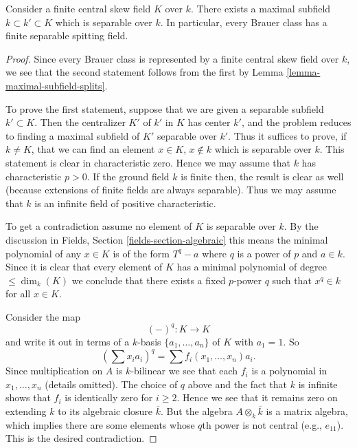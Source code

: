 \begin{proposition}
\label{proposition-separable-splitting-field}
Consider a finite central skew field $K$ over $k$.
There exists a maximal subfield $k \subset k' \subset K$ which
is separable over $k$.
In particular, every Brauer class has a finite separable
spitting field.
\end{proposition}

\begin{proof}
Since every Brauer class is represented by a finite central skew
field over $k$, we see that the second statement follows from the
first by
Lemma \ref{lemma-maximal-subfield-splits}.

\medskip\noindent
To prove the first statement, suppose that we are given a separable
subfield $k' \subset K$. Then the centralizer $K'$ of $k'$ in $K$
has center $k'$, and the problem reduces to finding a maximal
subfield of $K'$ separable over $k'$. Thus it suffices to prove, if
$k \not = K$, that we can find an element $x \in K$, $x \not \in k$
which is separable over $k$. This statement is clear in characteristic
zero. Hence we may assume that $k$ has characteristic $p > 0$. If the
ground field $k$ is finite then, the result is clear as well (because
extensions of finite fields are always separable). Thus we may assume
that $k$ is an infinite field of positive characteristic.

\medskip\noindent
To get a contradiction assume no element of $K$ is separable over $k$.
By the discussion in
Fields, Section \ref{fields-section-algebraic}
this means the minimal polynomial of any $x \in K$ is of the form
$T^q - a$ where $q$ is a power of $p$ and $a \in k$. Since it is
clear that every element of $K$ has a minimal polynomial of degree
$\leq \dim_k(K)$ we conclude that there exists a fixed $p$-power
$q$ such that $x^q \in k$ for all $x \in K$.

\medskip\noindent
Consider the map
$$
(-)^q : K \longrightarrow K
$$
and write it out in terms of a $k$-basis $\{a_1, \ldots, a_n\}$ of $K$
with $a_1 = 1$. So
$$
(\sum x_i a_i)^q = \sum f_i(x_1, \ldots, x_n)a_i.
$$
Since multiplication on $A$ is $k$-bilinear we see that each $f_i$
is a polynomial in $x_1, \ldots, x_n$ (details omitted).
The choice of $q$ above and the fact that $k$ is infinite shows that
$f_i$ is identically zero for $i \geq 2$. Hence we see that it remains
zero on extending $k$ to its algebraic closure $\overline{k}$. But the
algebra $A \otimes_k \overline{k}$ is a matrix algebra, which implies
there are some elements whose $q$th power is not central (e.g., $e_{11}$).
This is the desired contradiction.
\end{proof}

